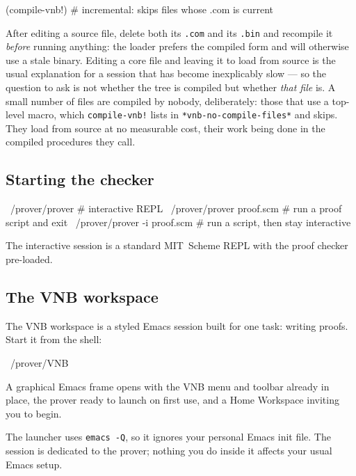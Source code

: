\begin{VNBsnip}
(compile-vnb!)               # incremental: skips files whose .com is current
\end{VNBsnip}

After editing a source file, delete both its \texttt{.com} and its \texttt{.bin}
and recompile it \emph{before} running anything: the loader prefers the compiled
form and will otherwise use a stale binary.  Editing a core file and leaving it
to load from source is the usual explanation for a session that has become
inexplicably slow --- so the question to ask is not whether the tree is
compiled but whether \emph{that file} is.  A small number of files are compiled
by nobody, deliberately: those that use a top-level macro, which
\texttt{compile-vnb!} lists in \texttt{*vnb-no-compile-files*} and skips.  They
load from source at no measurable cost, their work being done in the compiled
procedures they call.

\subsection{Starting the checker}

\begin{VNBsnip}
~/prover/prover              # interactive REPL
~/prover/prover proof.scm    # run a proof script and exit
~/prover/prover -i proof.scm # run a script, then stay interactive
\end{VNBsnip}

The interactive session is a standard MIT~Scheme REPL with the proof
checker pre-loaded.
\subsection{The VNB workspace}
\label{sec:emacs}

The VNB workspace is a styled Emacs session built for one task:
writing proofs.  Start it from the shell:

\begin{VNBsnip}
~/prover/VNB
\end{VNBsnip}

\noindent
A graphical Emacs frame opens with the VNB menu and toolbar already
in place, the prover ready to launch on first use, and a Home
Workspace inviting you to begin.

\begin{remark}
The launcher uses \texttt{emacs -Q}, so it ignores your personal
Emacs init file.  The session is dedicated to the prover; nothing
you do inside it affects your usual Emacs setup.
\end{remark}

